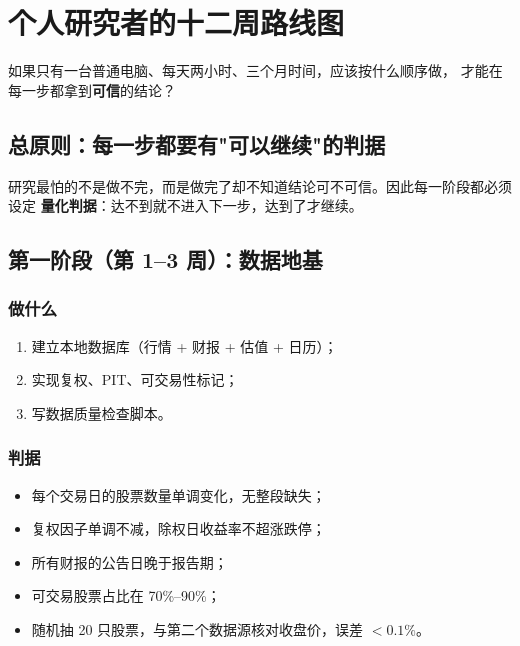 \chapter{个人研究者的十二周路线图}\label{ch:roadmap}

\begin{keybox}[本章要回答的问题]
如果只有一台普通电脑、每天两小时、三个月时间，应该按什么顺序做，
才能在每一步都拿到\textbf{可信}的结论？
\end{keybox}

\section{总原则：每一步都要有"可以继续"的判据}

研究最怕的不是做不完，而是做完了却不知道结论可不可信。因此每一阶段都必须设定
\textbf{量化判据}：达不到就不进入下一步，达到了才继续。

\section{第一阶段（第 1--3 周）：数据地基}

\subsection{做什么}

\begin{enumerate}
  \item 建立本地数据库（行情 + 财报 + 估值 + 日历）；
  \item 实现复权、PIT、可交易性标记；
  \item 写数据质量检查脚本。
\end{enumerate}

\subsection{判据}

\begin{itemize}
  \item 每个交易日的股票数量单调变化，无整段缺失；
  \item 复权因子单调不减，除权日收益率不超涨跌停；
  \item 所有财报的公告日晚于报告期；
  \item 可交易股票占比在 70\%--90\%；
  \item 随机抽 20 只股票，与第二个数据源核对收盘价，误差 $<0.1\%$。
\end{itemize}

